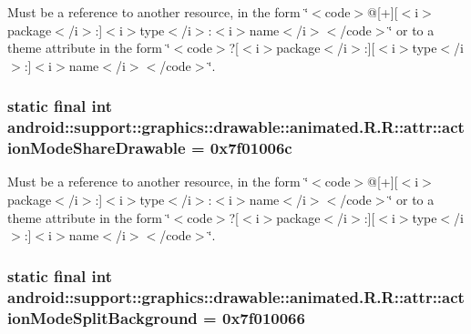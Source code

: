 Must be a reference to another resource, in the form \char`\"{}$<$code$>$@\mbox{[}+\mbox{]}\mbox{[}$<$i$>$package$<$/i$>$:\mbox{]}$<$i$>$type$<$/i$>$:$<$i$>$name$<$/i$>$$<$/code$>$\char`\"{} or to a theme attribute in the form \char`\"{}$<$code$>$?\mbox{[}$<$i$>$package$<$/i$>$:\mbox{]}\mbox{[}$<$i$>$type$<$/i$>$:\mbox{]}$<$i$>$name$<$/i$>$$<$/code$>$\char`\"{}. \hypertarget{classandroid_1_1support_1_1graphics_1_1drawable_1_1animated_1_1_r_1_1attr_94df30624ed2cf00803e73bd7d70ae55}{
\subsubsection[{actionModeShareDrawable}]{\setlength{\rightskip}{0pt plus 5cm}static final int android::support::graphics::drawable::animated.R.R::attr::actionModeShareDrawable = 0x7f01006c}}
\label{classandroid_1_1support_1_1graphics_1_1drawable_1_1animated_1_1_r_1_1attr_94df30624ed2cf00803e73bd7d70ae55}


Must be a reference to another resource, in the form \char`\"{}$<$code$>$@\mbox{[}+\mbox{]}\mbox{[}$<$i$>$package$<$/i$>$:\mbox{]}$<$i$>$type$<$/i$>$:$<$i$>$name$<$/i$>$$<$/code$>$\char`\"{} or to a theme attribute in the form \char`\"{}$<$code$>$?\mbox{[}$<$i$>$package$<$/i$>$:\mbox{]}\mbox{[}$<$i$>$type$<$/i$>$:\mbox{]}$<$i$>$name$<$/i$>$$<$/code$>$\char`\"{}. \hypertarget{classandroid_1_1support_1_1graphics_1_1drawable_1_1animated_1_1_r_1_1attr_c04ce3d3ae8d5eba409302e751128f92}{
\subsubsection[{actionModeSplitBackground}]{\setlength{\rightskip}{0pt plus 5cm}static final int android::support::graphics::drawable::animated.R.R::attr::actionModeSplitBackground = 0x7f010066}}
\label{classandroid_1_1support_1_1graphics_1_1drawable_1_1animated_1_1_r_1_1attr_c04ce3d3ae8d5eba409302e751128f92}


